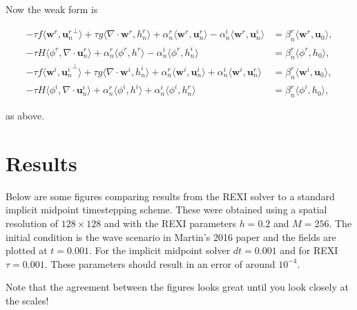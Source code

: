 \documentclass[14pt]{article}
\def\MM#1{\boldsymbol{#1}}
\begin{document}
Now the weak form is

\begin{align}
  -\tau f\langle\MM{w}^r, {\MM{u}_n^r}^\perp\rangle + \tau g\langle\nabla\cdot\MM{w}^r, h_n^r\rangle + \alpha_n^r\langle\MM{w}^r, \MM{u}_n^r\rangle - \alpha_n^i\langle\MM{w}^r, \MM{u}_n^i\rangle &= \beta_n^r\langle\MM{w}^r, \MM{u}_0\rangle, \\
  -\tau H\langle\phi^r, \nabla\cdot\MM{u}_n^r\rangle + \alpha_n^r\langle\phi^r, h^r\rangle - \alpha_n^i\langle\phi^r, h_n^i\rangle & = \beta_n^r \langle\phi^r, h_0\rangle, \\
  -\tau f\langle\MM{w}^i, {\MM{u}_n^i}^\perp\rangle + \tau g\langle\nabla\cdot\MM{w}^i, h_n^i\rangle + \alpha_n^r\langle\MM{w}^i, \MM{u}_n^i\rangle + \alpha_n^i\langle\MM{w}^i, \MM{u}_n^r\rangle &= \beta_n^r\langle\MM{w}^i, \MM{u}_0\rangle, \\
  -\tau H\langle\phi^i, \nabla\cdot\MM{u}_n^i\rangle + \alpha_n^r\langle\phi^i, h^i\rangle + \alpha_n^i\langle\phi^i, h_n^r\rangle & = \beta_n^r \langle\phi^i, h_0\rangle,
\end{align}

\noindent as above.

\section{Results}

Below are some figures comparing results from the REXI solver to a
standard implicit midpoint timestepping scheme. These were obtained
using a spatial resolution of $128\times 128$ and with the REXI
parameters $h=0.2$ and $M=256$. The initial condition is the wave
scenario in Martin's 2016 paper and the fields are plotted at
$t=0.001$. For the implicit midpoint solver $dt=0.001$ and for REXI
$\tau=0.001$. These parameters should result in an error of around
$10^{-4}$.

Note that the agreement between the figures looks great until you look
closely at the scales!
\end{document}

